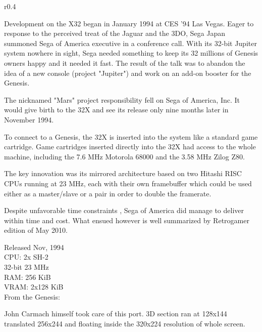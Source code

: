 \begin{wrapfigure}[4]{r}{0.4\textwidth}{
\centering {}}
\end{wrapfigure}
Development on the X32 began in January 1994 at CES '94 Las Vegas. Eager to response to the perceived treat of the Jaguar and the 3DO, Sega Japan summoned Sega of America executive in a conference call. With its 32-bit Jupiter system nowhere in sight, Sega needed something to keep its 32 millions of Genesis owners happy and it needed it fast. The result of the talk was to abandon the idea of a new console (project "Jupiter") and work on an add-on booster for the Genesis.\\
\par
 The nicknamed "Mars" project responsibility fell on Sega of America, Inc. It would give birth to the 32X and see its release only nine months later in November 1994.\\
\par
{}



To connect to a Genesis, the 32X is inserted into the system like a standard game cartridge. Game cartridges inserted directly into the 32X had access to the whole machine, including the 7.6 MHz Motorola 68000 and the 3.58 MHz Zilog Z80.\\
\par
The key innovation was its mirrored architecture based on two Hitashi RISC CPUs running at 23 MHz, each with their own framebuffer which could be used either as a master/slave or a pair in order to double the framerate.\\
\par
Despite unfavorable time constraints , Sega of America did manage to deliver within time and cost. What ensued however is well summarized by Retrogamer edition of May 2010.\\
\par



\par
{}
\par
   Released Nov, 1994\\
   CPU: 2x SH-2 \\
   32-bit 23 MHz\\
   RAM: 256 KiB\\
   VRAM: 2x128 KiB\\
   From the Genesis:\\
   \par
John Carmach himself took care of this port. 3D section ran at 128x144 translated 256x244 and floating inside the 320x224 resolution of whole screen.\\
\par

